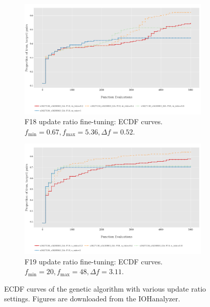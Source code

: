 \documentclass{article}
\begin{document}
\begin{figure}[!ht]
    \begin{subfigure}[h]{0.95\linewidth}
        \includegraphics[width=\linewidth]{ga/f18/urate_ecdf.png}
        \caption{F18 update ratio fine-tuning: ECDF curves. $f_{\min} = 0.67, f_{\max} = 5.36, \Delta f = 0.52$.}
    \end{subfigure}
    \hfill
    \begin{subfigure}[h]{0.95\linewidth}
        \includegraphics[width=\linewidth]{ga/f19/urate_ecdf.png}
        \caption{F19 update ratio fine-tuning: ECDF curves. $f_{\min} = 20, f_{\max} = 48, \Delta f = 3.11$.}
    \end{subfigure}
    \caption{ECDF curves of the genetic algorithm with various update ratio settings. Figures are downloaded from the IOHanalyzer.}
    \label{fig:experi-ga-urate-ecdf}
\end{figure}
\end{document}
